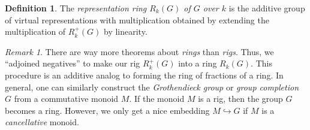 \documentclass[12pt]{article}
\theoremstyle{plain}
\theoremstyle{definition}
\newtheorem{definition}[theorem]{Definition}
\theoremstyle{remark}
\newtheorem{remark}[theorem]{Remark}
\numberwithin{equation}{section}
\begin{document}
\begin{definition}
The \emph{representation ring $R_k(G)$ of $G$ over $k$} is
the additive group of virtual representations with multiplication
obtained by extending the multiplication of $R^+_k(G)$ by linearity.
\end{definition}

\begin{remark}
There are way more theorems about \emph{rings} than \emph{rigs}.
Thus, we ``adjoined negatives'' to make our rig $R^+_k(G)$
into a ring $R_k(G)$.
This procedure is an additive analog to forming the ring of fractions of a ring.
In general, one can similarly construct the \emph{Grothendieck group}
or \emph{group completion} $G$ from a commutative monoid $M$.
If the monoid $M$ is a rig, then the group $G$ becomes a ring.
However, we only get a nice embedding $M \hookrightarrow G$ if
$M$ is a \emph{cancellative} monoid.
\end{remark}





\end{document}

